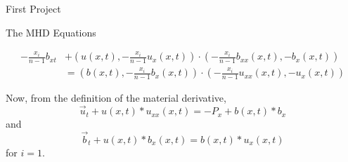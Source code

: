 \documentclass[11pt]{report}
\begin{document}
\begin{chapter}{First Project}
\begin{section}{The MHD Equations}
\begin{result}
			\begin{equation*}
				\begin{split}
					-\frac{x_i}{n - 1} b_{xt} &+
					(u(x, t), -\frac{x_i}{n - 1} u_x(x, t))
						\cdot (-\frac{x_i}{n - 1} b_{xx}(x, t), -b_x(x, t)) \\
					&= (b(x, t), -\frac{x_i}{n - 1} b_x(x, t))
						\cdot (-\frac{x_i}{n - 1} u_{xx}(x, t), -u_x(x, t))
				\end{split}
				\tag{$i > 1$}
			\end{equation*}
		\end{result}
		
		\begin{result}
			Now, from the definition of the material derivative,
			\begin{equation*}
				\vec{u}_t + u(x, t) * u_{xx}(x, t) = -P_x + b(x, t) * b_x
			\end{equation*}
			and
			\begin{equation*}
				\vec{b}_t + u(x, t) * b_x(x, t) = b(x, t) * u_x(x, t)
			\end{equation*}
			for $i = 1$.
		\end{result}
	\end{section}
\end{chapter}
\end{document}
